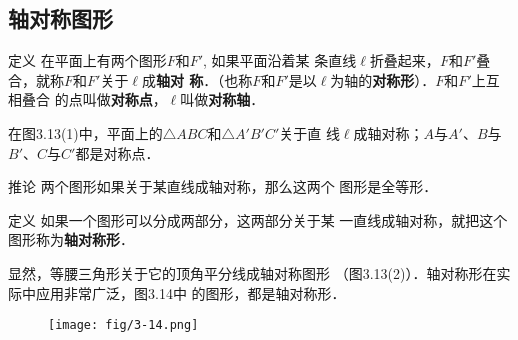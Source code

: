 \subsection{轴对称图形}
\begin{blk}{定义}
    在平面上有两个图形$F$和$F'$, 如果平面沿着某
条直线$\ell$折叠起来，$F$和$F'$叠合，就称$F$和$F'$关于$\ell$成\textbf{轴对
称}．（也称$F$和$F'$是以$\ell$为轴的\textbf{对称形}）．$F$和$F'$上互相叠合
的点叫做\textbf{对称点}，$\ell$叫做\textbf{对称轴}．
\end{blk}

在图3.13(1)中，平面上的$\triangle ABC$和$\triangle A'B'C'$关于直
线$\ell$成轴对称；$A$与$A'$、$B$与$B'$、$C$与$C'$都是对称点．

\begin{figure}[htp]
    \centering
{}
    \caption{}
\end{figure}

\begin{blk}{推论}
     两个图形如果关于某直线成轴对称，那么这两个
图形是全等形．
\end{blk}

\begin{blk}{定义}
    如果一个图形可以分成两部分，这两部分关于某
一直线成轴对称，就把这个图形称为\textbf{轴对称形}．
\end{blk}

显然，等腰三角形关于它的顶角平分线成轴对称图形
（图3.13(2)）．轴对称形在实际中应用非常广泛，图3.14中
的图形，都是轴对称形．
\begin{figure}[htp]
    \centering
\texttt{[image: fig/3-14.png]}
    \caption{}
\end{figure}


